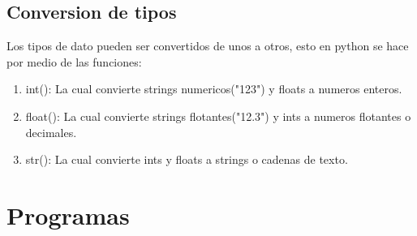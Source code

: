 \documentclass{article}
\begin{document}
\subsection{Conversion de tipos}
Los tipos de dato pueden ser convertidos de unos a otros, esto en python se hace por medio de las funciones:
\begin{enumerate}
    \item int(): La cual convierte strings numericos("123") y floats a numeros enteros. 
    \item float(): La cual convierte strings flotantes("12.3") y ints a numeros flotantes o decimales.  
    \item str(): La cual convierte ints y floats a strings o cadenas de texto. 
\end{enumerate}
\section{Programas}
\end{document}
